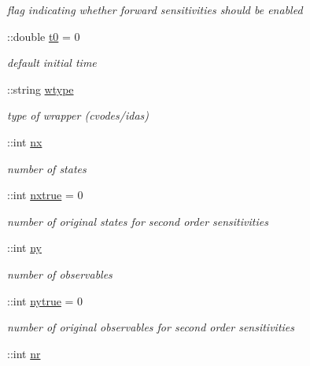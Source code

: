 \begin{DoxyCompactItemize}
\begin{DoxyCompactList}\small\item\em flag indicating whether forward sensitivities should be enabled \end{DoxyCompactList}\item 
\+::double \hyperlink{classamimodel_abdb5a42ffee3ca622484b53a322f1004}{t0} = 0
\begin{DoxyCompactList}\small\item\em default initial time \end{DoxyCompactList}\item 
\hypertarget{classamimodel_a5376250224ce32fb558d88aa0b5a93ff}{}\+::string \hyperlink{classamimodel_a5376250224ce32fb558d88aa0b5a93ff}{wtype}\label{classamimodel_a5376250224ce32fb558d88aa0b5a93ff}

\begin{DoxyCompactList}\small\item\em type of wrapper (cvodes/idas) \end{DoxyCompactList}\item 
\hypertarget{classamimodel_a84e4236f07668a770c27567f1f9615ff}{}\+::int \hyperlink{classamimodel_a84e4236f07668a770c27567f1f9615ff}{nx}\label{classamimodel_a84e4236f07668a770c27567f1f9615ff}

\begin{DoxyCompactList}\small\item\em number of states \end{DoxyCompactList}\item 
\+::int \hyperlink{classamimodel_a49c476de14a021114feb8c95da04952a}{nxtrue} = 0
\begin{DoxyCompactList}\small\item\em number of original states for second order sensitivities \end{DoxyCompactList}\item 
\hypertarget{classamimodel_a289ca425eb368f1d582b6be2be0d3dfc}{}\+::int \hyperlink{classamimodel_a289ca425eb368f1d582b6be2be0d3dfc}{ny}\label{classamimodel_a289ca425eb368f1d582b6be2be0d3dfc}

\begin{DoxyCompactList}\small\item\em number of observables \end{DoxyCompactList}\item 
\+::int \hyperlink{classamimodel_ac91d7b36031ec122abc9f739692b02e8}{nytrue} = 0
\begin{DoxyCompactList}\small\item\em number of original observables for second order sensitivities \end{DoxyCompactList}\item 
\hypertarget{classamimodel_a70c1a5f25e12e70da97faf350ec11f8b}{}\+::int \hyperlink{classamimodel_a70c1a5f25e12e70da97faf350ec11f8b}{nr}\label{classamimodel_a70c1a5f25e12e70da97faf350ec11f8b}


\end{DoxyCompactItemize}
